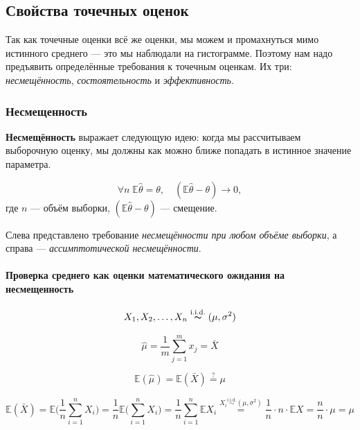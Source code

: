 \documentclass[
  letterpaper,
]{scrbook}
\let\oldparagraph\paragraph
\renewcommand{\paragraph}[1]{\oldparagraph{#1}\mbox{}}
\newcommand{\expect}{\mathbb{E}}
\newcommand{\iid}{\text{i.i.d.}}
\theoremstyle{definition}
\theoremstyle{remark}
\begin{document}
\subsection{Свойства точечных
оценок}\label{ux441ux432ux43eux439ux441ux442ux432ux430-ux442ux43eux447ux435ux447ux43dux44bux445-ux43eux446ux435ux43dux43eux43a}

Так как точечные оценки всё же оценки, мы можем и промахнуться мимо
истинного среднего --- это мы наблюдали на гистограмме. Поэтому нам надо
предъявить определённые требования к точечным оценкам. Их три:
\emph{несмещённость}, \emph{состоятельность} и \emph{эффективность}.

\subsubsection{Несмещенность}\label{ux43dux435ux441ux43cux435ux449ux435ux43dux43dux43eux441ux442ux44c}

\textbf{Несмещённость} выражает следующую идею: когда мы рассчитываем
выборочную оценку, мы должны как можно ближе попадать в истинное
значение параметра.

\[
\forall n \; \mathbb{E} \hat \theta = \theta, \quad (\mathbb{E}\hat \theta - \theta) \rightarrow 0,
\] где \(n\) --- объём выборки, \((\mathbb{E}\hat \theta - \theta)\) ---
смещение.

Слева представлено требование \emph{несмещённости при любом объёме
выборки}, а справа --- \emph{ассимптотической несмещённости}.

\paragraph{Проверка среднего как оценки математического ожидания на
несмещенность}\label{ux43fux440ux43eux432ux435ux440ux43aux430-ux441ux440ux435ux434ux43dux435ux433ux43e-ux43aux430ux43a-ux43eux446ux435ux43dux43aux438-ux43cux430ux442ux435ux43cux430ux442ux438ux447ux435ux441ux43aux43eux433ux43e-ux43eux436ux438ux434ux430ux43dux438ux44f-ux43dux430-ux43dux435ux441ux43cux435ux449ux435ux43dux43dux43eux441ux442ux44c}

\[ 
X_1, X_2, \dots , X_n \overset{\iid}{\thicksim} (\mu, \sigma^2)
\]

\[
\hat \mu = \frac{1}{m}\sum_{j=1}^m x_j = \bar X 
\]

\[
\expect (\hat \mu) = \expect (\bar X) \overset{?}{=} \mu
\]

\[
\expect (\bar X) = \expect \big (\frac{1}{n} \sum_{i=1}^n X_i \big ) = \frac{1}{n} \expect \Big( \sum_{i=1}^n X_i \Big) = \frac{1}{n} \sum_{i=1}^n \expect X_i \overset{X_i \overset{\iid}{\sim} (\mu, \sigma^2)}{=} \frac{1}{n} \cdot n \cdot \expect X = \frac{n}{n} \cdot \mu = \mu
\]
\end{document}
